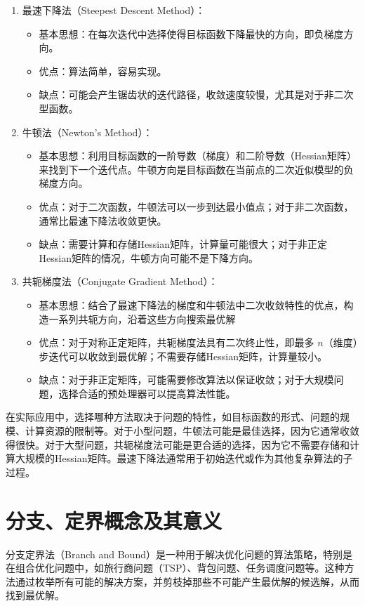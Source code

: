 \documentclass[12pt, a4paper, oneside]{ctexart}
\begin{document}
\begin{enumerate}[(1)]
  \item 最速下降法（Steepest Descent Method）：
    \begin{itemize}
      \item 基本思想：在每次迭代中选择使得目标函数下降最快的方向，即负梯度方向。
      \item 优点：算法简单，容易实现。
      \item 缺点：可能会产生锯齿状的迭代路径，收敛速度较慢，尤其是对于非二次型函数。
    \end{itemize}
  \item 牛顿法（Newton’s Method）：
    \begin{itemize}
      \item 基本思想：利用目标函数的一阶导数（梯度）和二阶导数（Hessian矩阵）来找到下一个迭代点。牛顿方向是目标函数在当前点的二次近似模型的负梯度方向。
      \item 优点：对于二次函数，牛顿法可以一步到达最小值点；对于非二次函数，通常比最速下降法收敛更快。 \item 缺点：需要计算和存储Hessian矩阵，计算量可能很大；对于非正定Hessian矩阵的情况，牛顿方向可能不是下降方向。 \end{itemize} \item 共轭梯度法（Conjugate Gradient Method）： \begin{itemize} \item 基本思想：结合了最速下降法的梯度和牛顿法中二次收敛特性的优点，构造一系列共轭方向，沿着这些方向搜索最优解
      \item 优点：对于对称正定矩阵，共轭梯度法具有二次终止性，即最多 \( n \)（维度）步迭代可以收敛到最优解；不需要存储Hessian矩阵，计算量较小。
      \item 缺点：对于非正定矩阵，可能需要修改算法以保证收敛；对于大规模问题，选择合适的预处理器可以提高算法性能。
    \end{itemize}
  \end{enumerate}
在实际应用中，选择哪种方法取决于问题的特性，如目标函数的形式、问题的规模、计算资源的限制等。对于小型问题，牛顿法可能是最佳选择，因为它通常收敛得很快。对于大型问题，共轭梯度法可能是更合适的选择，因为它不需要存储和计算大规模的Hessian矩阵。最速下降法通常用于初始迭代或作为其他复杂算法的子过程。

\section{分支、定界概念及其意义}
分支定界法（Branch and Bound）是一种用于解决优化问题的算法策略，特别是在组合优化问题中，如旅行商问题（TSP）、背包问题、任务调度问题等。这种方法通过枚举所有可能的解决方案，并剪枝掉那些不可能产生最优解的候选解，从而找到最优解。
\end{document}
